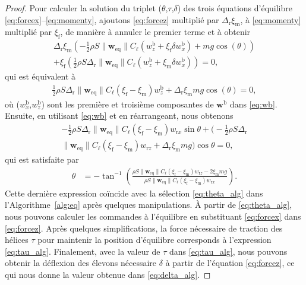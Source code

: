 \begin{proof}
        Pour calculer la solution du triplet ($\theta$,$\tau$,$\delta$) des trois équations d'équilibre \eqref{eq:forcex}--\eqref{eq:momenty}, ajoutons \eqref{eq:forcez} multiplié par $\Delta_{\text{r}} \xi_{\text{m}}$, à \eqref{eq:momenty} multiplié par $\xi_{\text{f}}$, de manière à annuler le premier terme et à obtenir
        \begin{multline*}
            \Delta_{\text{r}} \xi_{\text{m}} \left( - \frac{1}{2}\rho S \lVert \boldsymbol{w}_{\mathrm{eq}} \rVert C_{\ell} (w_{z}^{\text{b}} + \xi_{\text{f}} \delta w_{x}^{\text{b}}) + mg \cos(\theta) \right) \\+ \xi_{\text{f}} \left(\frac{1}{2}\rho S  \Delta_{\text{r}} \lVert \boldsymbol{w}_{\mathrm{eq}} \rVert C_{\ell} (w_{z}^{\text{b}} + \xi_{\text{m}} \delta w_{x}^{\text{b}})  \right) = 0,
        \end{multline*}
        qui est équivalent à
        \begin{align*}
            \frac{1}{2}\rho S  \Delta_{\text{r}} \lVert \boldsymbol{w}_{\mathrm{eq}} \rVert C_{\ell}  (\xi_{\text{f}} - \xi_{\text{m}}) w_{z}^{\text{b}} +   \Delta_{\text{r}} \xi_{\text{m}} mg \cos(\theta)  = 0,
        \end{align*}
        où ($w_{x}^{\text{b}}$,$w_{z}^{\text{b}}$) sont les première et troisième composantes de $\boldsymbol{w}^{\text{b}}$ dans \eqref{eq:wb}. Ensuite, en utilisant \eqref{eq:wb} et en réarrangeant, nous obtenons
        \begin{multline*}
                -\frac{1}{2}\rho S  \Delta_{\text{r}} \lVert \boldsymbol{w}_{\mathrm{eq}} \rVert C_{\ell}  (\xi_{\text{f}} - \xi_{\text{m}}) w_{\text{r}x} \sin{\theta}  +\bigg( -\frac{1}{2}\rho S  \Delta_{\text{r}} \\ \lVert \boldsymbol{w}_{\mathrm{eq}} \rVert C_{\ell}  (\xi_{\text{f}} - \xi_{\text{m}})w_{\text{r}z} +   \Delta_{\text{r}} \xi_{\text{m}} mg \bigg) \cos{\theta} = 0,
        \end{multline*}
        qui est satisfaite par
            \begin{align} \label{eq:theta}
                \theta &=  -\tan^{-1}\left(\frac{\rho S \lVert \boldsymbol{w}_{\mathrm{eq}} \rVert C_{\ell}  (\xi_{\text{f}} - \xi_{\text{m}})w_{\text{r}z} - 2 \xi_{\text{m}} mg }{\rho S\lVert \boldsymbol{w}_{\mathrm{eq}} \rVert C_{\ell}  (\xi_{\text{f}} - \xi_{\text{m}}) w_{\text{r}x}}\right).
            \end{align}
            Cette dernière expression coïncide avec la sélection \eqref{eq:theta_alg} dans l'Algorithme~\ref{alg:eq} après quelques manipulations.
        À partir de \eqref{eq:theta_alg}, nous pouvons calculer les commandes à l'équilibre en substituant \eqref{eq:forcex} dans \eqref{eq:forcez}. Après quelques simplifications, la force nécessaire de traction des hélices  $\tau$ pour maintenir la position d'équilibre corresponds à l'expression  \eqref{eq:tau_alg}. Finalement, avec la valeur de $\tau$ dans \eqref{eq:tau_alg}, nous pouvons obtenir la déflexion des élevons nécessaire $\delta$ à partir de l'équation \eqref{eq:forcez}, ce qui nous donne la valeur obtenue dans \eqref{eq:delta_alg}.
    \end{proof}
